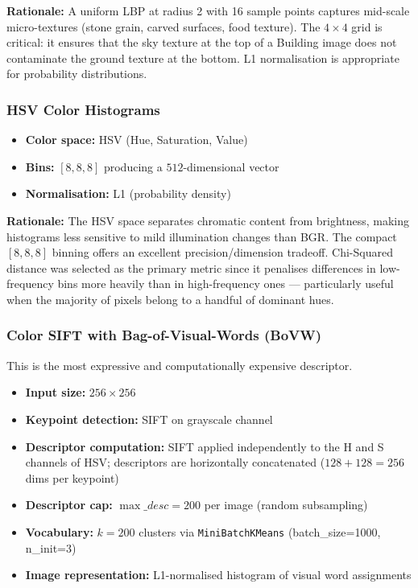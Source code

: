 \documentclass[11pt, a4paper]{article}
\begin{document}
\textbf{Rationale:} A uniform LBP at radius 2 with 16 sample points captures mid-scale micro-textures (stone grain, carved surfaces, food texture). The $4 \times 4$ grid is critical: it ensures that the sky texture at the top of a Building image does not contaminate the ground texture at the bottom. L1 normalisation is appropriate for probability distributions.

\subsubsection{HSV Color Histograms}
\begin{itemize}
  \item \textbf{Color space:} HSV (Hue, Saturation, Value)
  \item \textbf{Bins:} $[8, 8, 8]$ producing a $512$-dimensional vector
  \item \textbf{Normalisation:} L1 (probability density)
\end{itemize}

\textbf{Rationale:} The HSV space separates chromatic content from brightness, making histograms less sensitive to mild illumination changes than BGR. The compact $[8, 8, 8]$ binning offers an excellent precision/dimension tradeoff. Chi-Squared distance was selected as the primary metric since it penalises differences in low-frequency bins more heavily than in high-frequency ones — particularly useful when the majority of pixels belong to a handful of dominant hues.

\subsubsection{Color SIFT with Bag-of-Visual-Words (BoVW)}
This is the most expressive and computationally expensive descriptor.

\begin{itemize}
  \item \textbf{Input size:} $256 \times 256$
  \item \textbf{Keypoint detection:} SIFT on grayscale channel
  \item \textbf{Descriptor computation:} SIFT applied independently to the H and S channels of HSV; descriptors are horizontally concatenated ($128 + 128 = 256$ dims per keypoint)
  \item \textbf{Descriptor cap:} $\max\_desc = 200$ per image (random subsampling)
  \item \textbf{Vocabulary:} $k = 200$ clusters via \texttt{MiniBatchKMeans} (batch\_size=1000, n\_init=3)
  \item \textbf{Image representation:} L1-normalised histogram of visual word assignments
\end{itemize}
\end{document}
